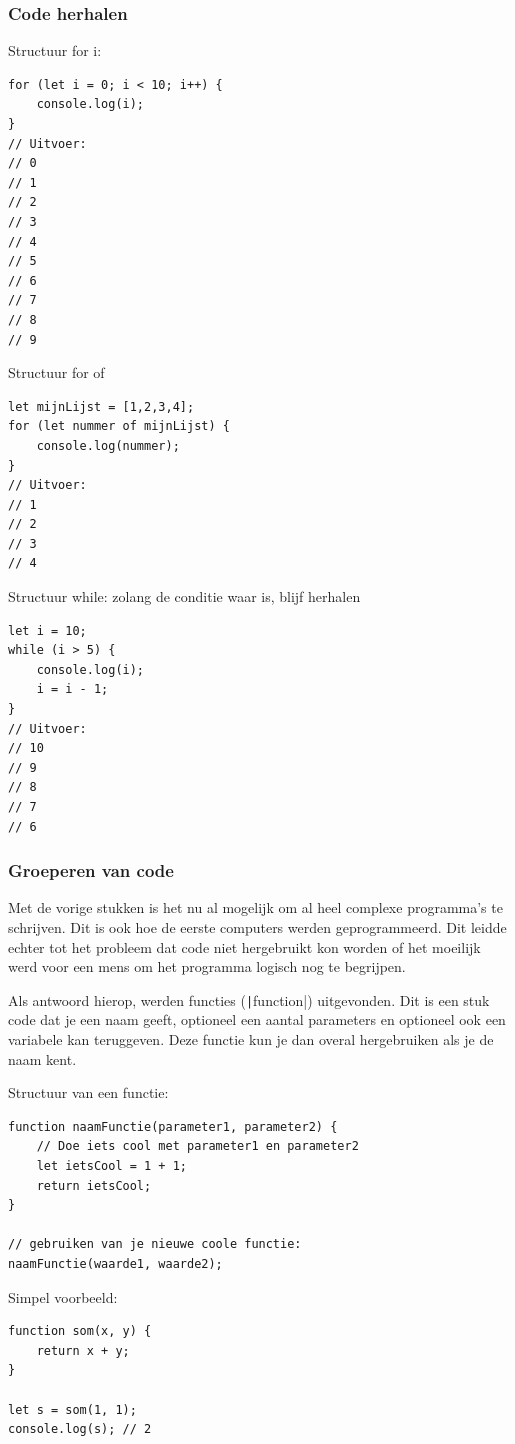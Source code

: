 \subsubsection{Code herhalen}%
\label{ssub:Code herhalen}

Structuur for i:
\begin{verbatim}
for (let i = 0; i < 10; i++) {
    console.log(i);
}
// Uitvoer:
// 0
// 1
// 2
// 3
// 4
// 5
// 6
// 7
// 8
// 9
\end{verbatim}

Structuur for of
\begin{verbatim}
let mijnLijst = [1,2,3,4];
for (let nummer of mijnLijst) {
    console.log(nummer);
}
// Uitvoer:
// 1
// 2
// 3
// 4
\end{verbatim}

Structuur while: zolang de conditie waar is, blijf herhalen
\begin{verbatim}
let i = 10;
while (i > 5) {
    console.log(i);
    i = i - 1;
}
// Uitvoer:
// 10
// 9
// 8
// 7
// 6
\end{verbatim}

\subsubsection{Groeperen van code}%
\label{ssub:Groeperen van code}

Met de vorige stukken is het nu al mogelijk om al heel complexe programma's te
schrijven. Dit is ook hoe de eerste computers werden geprogrammeerd. Dit leidde 
echter tot het probleem dat code niet hergebruikt kon worden of het moeilijk 
werd voor een mens om het programma logisch nog te begrijpen.

Als antwoord hierop, werden functies (\texttt|function|)
uitgevonden. Dit is een stuk code dat je een naam geeft, optioneel een aantal
parameters en optioneel ook een variabele kan teruggeven. Deze functie kun je
dan overal hergebruiken als je de naam kent.

Structuur van een functie:
\begin{verbatim}
function naamFunctie(parameter1, parameter2) {
    // Doe iets cool met parameter1 en parameter2
    let ietsCool = 1 + 1;
    return ietsCool;
}

// gebruiken van je nieuwe coole functie:
naamFunctie(waarde1, waarde2);
\end{verbatim}

Simpel voorbeeld:
\begin{verbatim}
function som(x, y) {
    return x + y;
}

let s = som(1, 1);
console.log(s); // 2
\end{verbatim}

